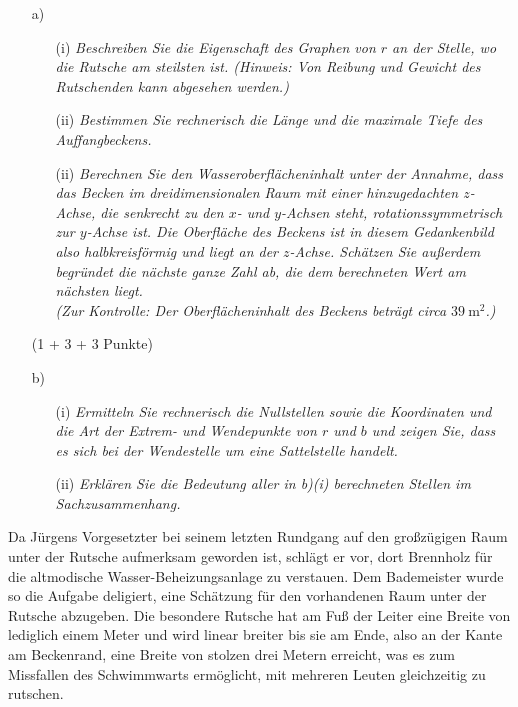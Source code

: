 \documentclass[ngerman, a4paper, 11pt]{article}
\begin{document}
\begin{enumerate}
    \item[a)]
        \begin{enumerate}
            \item[(i)]
                \textit{Beschreiben Sie die Eigenschaft des Graphen von $r$ an der Stelle, wo die Rutsche am steilsten ist. (Hinweis: Von Reibung und Gewicht des Rutschenden kann abgesehen werden.)}
            \item[(ii)]    
                \textit{Bestimmen Sie rechnerisch die Länge und die maximale Tiefe des Auffangbeckens.}
            \item[(ii)]
                \textit{Berechnen Sie den Wasseroberflächeninhalt unter der Annahme,
                dass das Becken im dreidimensionalen Raum mit einer hinzugedachten $z$-Achse,
                die senkrecht zu den $x$- und $y$-Achsen steht, rotationssymmetrisch zur $y$-Achse ist.
                Die Oberfläche des Beckens ist in diesem Gedankenbild also halbkreisförmig und liegt an der $z$-Achse.
                Schätzen Sie außerdem begründet die nächste ganze Zahl ab, die dem berechneten Wert am nächsten liegt.\\
                (Zur Kontrolle: Der Oberflächeninhalt des Beckens beträgt circa $\SI{39}{\square\metre}$.)}
        \end{enumerate}
        \begin{flushright}
            (1 + 3 + 3 Punkte)
        \end{flushright}
    \item[b)]
        \begin{enumerate}
            \item[(i)]
                \textit{Ermitteln Sie rechnerisch die Nullstellen
                sowie die Koordinaten und die Art der Extrem- und Wendepunkte von $r$ und $b$
                und zeigen Sie, dass es sich bei der Wendestelle um eine Sattelstelle handelt.}
            \item[(ii)]
                \textit{Erklären Sie die Bedeutung aller in b)(i) berechneten Stellen im Sachzusammenhang.}
        \end{enumerate}
\end{enumerate}

Da Jürgens Vorgesetzter bei seinem letzten Rundgang auf den großzügigen Raum unter der Rutsche aufmerksam geworden ist,
schlägt er vor, dort Brennholz für die altmodische Wasser-Beheizungsanlage zu verstauen.
Dem Bademeister wurde so die Aufgabe deligiert, eine Schätzung für den vorhandenen Raum unter der Rutsche abzugeben.
Die besondere Rutsche hat am Fuß der Leiter eine Breite von lediglich einem Meter und wird linear breiter
bis sie am Ende, also an der Kante am Beckenrand, eine Breite von stolzen drei Metern erreicht,
was es zum Missfallen des Schwimmwarts ermöglicht, mit mehreren Leuten gleichzeitig zu rutschen.
\end{document}

